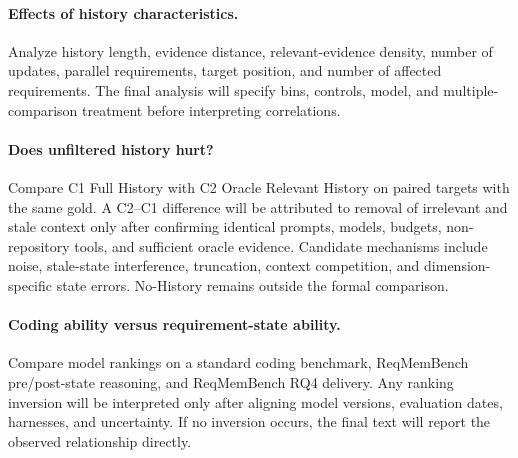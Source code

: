 \documentclass{article} %
\begin{document}
\paragraph{Effects of history characteristics.}
Analyze history length, evidence distance, relevant-evidence density, number of updates, parallel requirements, target position, and number of affected requirements. The final analysis will specify bins, controls, model, and multiple-comparison treatment before interpreting correlations.

\paragraph{Does unfiltered history hurt?}
Compare C1 Full History with C2 Oracle Relevant History on paired targets with the same gold. A C2--C1 difference will be attributed to removal of irrelevant and stale context only after confirming identical prompts, models, budgets, non-repository tools, and sufficient oracle evidence. Candidate mechanisms include noise, stale-state interference, truncation, context competition, and dimension-specific state errors. No-History remains outside the formal comparison.

\paragraph{Coding ability versus requirement-state ability.}
Compare model rankings on a standard coding benchmark, ReqMemBench pre/post-state reasoning, and ReqMemBench RQ4 delivery. Any ranking inversion will be interpreted only after aligning model versions, evaluation dates, harnesses, and uncertainty. If no inversion occurs, the final text will report the observed relationship directly.
\end{document}
